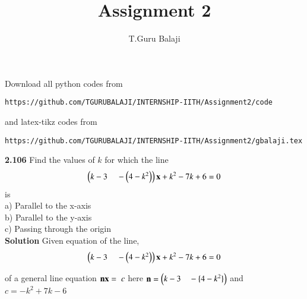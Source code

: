 \documentclass[journal,12pt,twocolumn]{IEEEtran}
\begin{document}
     \def\centbox#1{\makebox[0in]{#1}}
     \def\topbox#1{\raisebox{-\baselineskip}[0in][0in]{#1}}
     \def\midbox#1{\raisebox{-0.5\baselineskip}[0in][0in]{#1}}
\vspace{3cm}
\title{Assignment 2}
\author{T.Guru Balaji}
\maketitle
\newpage
\bigskip
\renewcommand{\thefigure}{\theenumi}
\renewcommand{\thetable}{\theenumi}
Download all python codes from 
\begin{lstlisting}
https://github.com/TGURUBALAJI/INTERNSHIP-IITH/Assignment2/code
\end{lstlisting}
%
and latex-tikz codes from 
%
\begin{lstlisting}
https://github.com/TGURUBALAJI/INTERNSHIP-IITH/Assignment2/gbalaji.tex
\end{lstlisting}
\vskip 1cm
\textbf{2.106 }Find the values of $k$ for which the line
\begin{align}
\myvec{k-3 \hspace{4mm}-\myvec{4-k^2}}\vec{x}+k^2-7k+6=0
\end{align}
is\\
a) Parallel to the x-axis\\
b) Parallel to the y-axis\\
c) Passing through the origin\\
%
\vskip 0.5cm
\textbf{Solution} Given equation of the line, 
\begin{align}
\myvec{k-3 \hspace{4mm}-\myvec{4-k^2}}\vec{x}+k^2-7k+6=0\label{eq:1}
\end{align}
\begin{center}
 \begin{sloppypar}of a general line equation\hspace{4mm} ${\vec{nx = }\hspace{2mm}c}$\newline
here ${\vec{n}=\myvec{k-3 \hspace{3.5mm}-\{4-k^2\}}}$\newline
and\hspace{4mm} ${c = -k^2+7k-6}$\end{sloppypar}\end{center}
\end{document}
